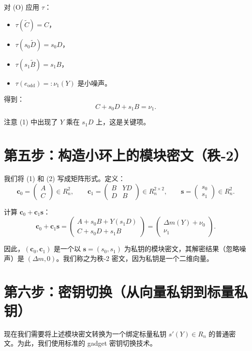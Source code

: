 \documentclass{article}
\begin{document}
对 (O) 应用 $\tau$：
\begin{itemize}
  \item $\tau(\tilde{C}) = C$，
  \item $\tau(s_0 \tilde{D}) = s_0 D$，
  \item $\tau(s_1 \tilde{B}) = s_1 B$，
  \item $\tau(e_{\text{odd}}) =: \nu_1(Y)$ 是小噪声。
\end{itemize}
得到：
\[
C + s_0 D + s_1 B = \nu_1. \tag{2}
\]

注意 (1) 中出现了 $Y$ 乘在 $s_1 D$ 上，这是关键项。

\section{第五步：构造小环上的模块密文（秩‑2）}

我们将 (1) 和 (2) 写成矩阵形式。定义：
\[
\mathbf{c}_0 = \begin{pmatrix} A \\ C \end{pmatrix} \in R_n^2, \qquad
\mathbf{c}_1 = \begin{pmatrix} B & Y D \\ D & B \end{pmatrix} \in R_n^{2\times 2}, \qquad
\mathbf{s} = \begin{pmatrix} s_0 \\ s_1 \end{pmatrix} \in R_n^2.
\]

计算 $\mathbf{c}_0 + \mathbf{c}_1 \mathbf{s}$：
\[
\mathbf{c}_0 + \mathbf{c}_1 \mathbf{s} =
\begin{pmatrix}
A + s_0 B + Y (s_1 D) \\
C + s_0 D + s_1 B
\end{pmatrix}
= \begin{pmatrix}
\Delta m(Y) + \nu_0 \\
\nu_1
\end{pmatrix}.
\]

因此，$(\mathbf{c}_0, \mathbf{c}_1)$ 是一个以 $\mathbf{s} = (s_0, s_1)$ 为私钥的模块密文，其解密结果（忽略噪声）是 $(\Delta m, 0)$。我们称之为秩‑2 密文，因为私钥是一个二维向量。

\section{第六步：密钥切换（从向量私钥到标量私钥）}

现在我们需要将上述模块密文转换为一个绑定标量私钥 $s'(Y) \in R_n$ 的普通密文。为此，我们使用标准的 gadget 密钥切换技术。
\end{document}
